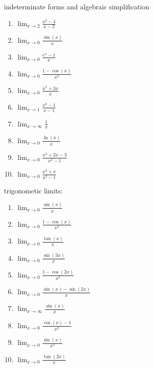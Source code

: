 \documentclass{article}
\begin{document}
indeterminate forms and algebraic simplification
\begin{enumerate}
        \item $\lim_{x \to 2} \frac{x^2 - 4}{x - 2}$
        \item $\lim_{x \to 0} \frac{\sin(x)}{x}$
        \item $\lim_{x \to 0} \frac{e^x - 1}{x}$
        \item $\lim_{x \to 0} \frac{1 - \cos(x)}{x^2}$
        \item $\lim_{x \to 0} \frac{x^2 + 3x}{x}$
        \item $\lim_{x \to 1} \frac{x^3 - 1}{x - 1}$
        \item $\lim_{x \to \infty} \frac{1}{x}$
        \item $\lim_{x \to 0} \frac{\ln(x)}{x}$
        \item $\lim_{x \to 0} \frac{x^2 + 2x - 3}{x^2 - 1}$
        \item $\lim_{x \to 0} \frac{x^3 + x}{x^2 - 1}$
\end{enumerate}

trigonometic limits:
\begin{enumerate}
        \item $\lim_{x \to 0} \frac{\sin(x)}{x}$
        \item $\lim_{x \to 0} \frac{1 - \cos(x)}{x^2}$
        \item $\lim_{x \to 0} \frac{\tan(x)}{x}$
        \item $\lim_{x \to 0} \frac{\sin(3x)}{x}$
        \item $\lim_{x \to 0} \frac{1 - \cos(2x)}{x^2}$
        \item $\lim_{x \to 0} \frac{\sin(x) - \sin(2x)}{x}$
        \item $\lim_{x \to \infty} \frac{\sin(x)}{x}$
        \item $\lim_{x \to 0} \frac{\cos(x) - 1}{x^2}$
        \item $\lim_{x \to 0} \frac{\sin(x)}{x^3}$
        \item $\lim_{x \to 0} \frac{\tan(2x)}{x}$
\end{enumerate}
\end{document}
